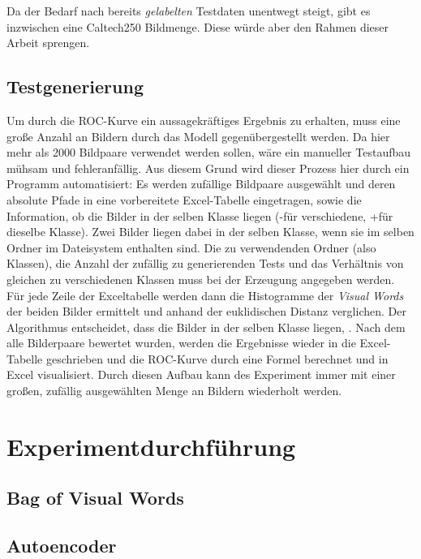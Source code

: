 Da der Bedarf nach bereits \textit{gelabelten} Testdaten unentwegt steigt, gibt es inzwischen eine Caltech250 Bildmenge. Diese würde aber den Rahmen dieser Arbeit sprengen.

\subsection{Testgenerierung}

Um durch die ROC-Kurve ein aussagekräftiges Ergebnis zu erhalten, muss eine große Anzahl an Bildern durch das Modell gegenübergestellt werden. Da hier mehr als 2000 Bildpaare verwendet werden sollen, wäre ein manueller Testaufbau mühsam und fehleranfällig. Aus diesem Grund wird dieser Prozess hier durch ein Programm automatisiert: Es werden zufällige Bildpaare ausgewählt und deren absolute Pfade in eine vorbereitete Excel-Tabelle eingetragen, sowie die Information, ob die Bilder in der selben Klasse liegen (\glqq -\grqq für verschiedene, \glqq +\grqq für dieselbe Klasse). Zwei Bilder liegen dabei in der selben Klasse, wenn sie im selben Ordner im Dateisystem enthalten sind. Die zu verwendenden Ordner (also Klassen), die Anzahl der zufällig zu generierenden Tests und das Verhältnis von gleichen zu verschiedenen Klassen muss bei der Erzeugung angegeben werden. Für jede Zeile der Exceltabelle werden dann die Histogramme der \textit{Visual Words} der beiden Bilder ermittelt und anhand der euklidischen Distanz verglichen. Der Algorithmus entscheidet, dass die Bilder in der selben Klasse liegen, . Nach dem alle Bilderpaare bewertet wurden, werden die Ergebnisse wieder in die Excel-Tabelle geschrieben und die ROC-Kurve durch eine Formel berechnet und in Excel visualisiert. Durch diesen Aufbau kann des Experiment immer mit einer großen, zufällig ausgewählten Menge an Bildern wiederholt werden.

\section{Experimentdurchführung}

\subsection{Bag of Visual Words}

\subsection{Autoencoder}